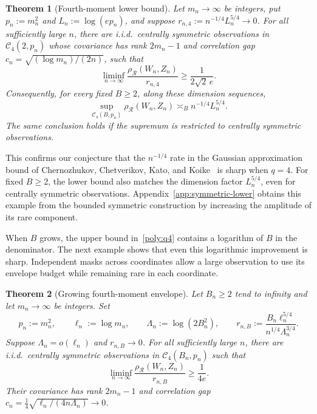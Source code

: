 \documentclass[11pt,letterpaper]{article}
\newtheorem{theorem}{Theorem}
\theoremstyle{remark}
\newcommand{\rh}{\rho_{\mathcal R}}
\begin{document}
\begin{theorem}[Fourth-moment lower bound]\label{opt:q4-lower}
Let \(m_n\to\infty\) be integers, put \(p_n:=m_n^2\) and
\(L_n:=\log(ep_n)\), and suppose
\(r_{n,4}:=n^{-1/4}L_n^{5/4}\to0\).
For all sufficiently large \(n\), there are i.i.d.\ centrally
symmetric observations in \(\mathcal C_4(2,p_n)\) whose covariance
has rank \(2m_n-1\) and correlation gap
\(c_n=\sqrt{(\log m_n)/(2n)}\), such that
\begin{equation}
 \liminf_{n\to\infty}
 \frac{\rh(W_n,Z_n)}{r_{n,4}}\ge\frac1{2\sqrt2\,e}.
 \label{opt:eq:q4-lower}
\end{equation}
Consequently, for every fixed \(B\ge2\), along these dimension sequences,
\begin{equation}
 \sup_{\mathcal C_4(B,p_n)}\rh(W_n,Z_n)
 \asymp_B n^{-1/4}L_n^{5/4}.
 \label{lower:q4-fixed}
\end{equation}
The same conclusion holds if the supremum is restricted to centrally
symmetric observations.
\end{theorem}

This confirms our conjecture that the \(n^{-1/4}\) rate in the Gaussian
approximation bound of Chernozhukov, Chetverikov, Kato, and
Koike~\cite[Theorem~2.5]{CCKK2022} is sharp when \(q=4\).
For fixed \(B\ge2\), the lower bound also matches the dimension factor
\(L_n^{5/4}\), even for centrally symmetric observations.
Appendix~\ref{app:symmetric-lower} obtains this example from the
bounded symmetric construction by increasing the amplitude of its rare
component.

When \(B\) grows, the upper bound in~\eqref{poly:q4} contains a
logarithm of \(B\) in the denominator. The next example shows that even
this logarithmic improvement is sharp. Independent masks across
coordinates allow a large observation to use its envelope budget while
remaining rare in each coordinate.

\begin{theorem}[Growing fourth-moment envelope]\label{opt:q4-growing}
Let \(B_n\ge2\) tend to infinity and let \(m_n\to\infty\) be integers.
Set
\[
 p_n:=m_n^2,\qquad \ell_n:=\log m_n,\qquad
 \Lambda_n:=\log(2B_n^2),\qquad
 r_{n,B}:=\frac{B_n\ell_n^{5/4}}{n^{1/4}\Lambda_n^{3/4}}.
\]
Suppose \(\Lambda_n=o(\ell_n)\) and \(r_{n,B}\to0\).
For all sufficiently large \(n\), there are i.i.d.\ centrally
symmetric observations in \(\mathcal C_4(B_n,p_n)\) such that
\begin{equation}
 \liminf_{n\to\infty}
 \frac{\rh(W_n,Z_n)}{r_{n,B}}\ge\frac1{4e}.
 \label{opt:eq:q4-growing}
\end{equation}
Their covariance has rank \(2m_n-1\) and correlation gap
\(c_n=\frac14\sqrt{\ell_n/(4n\Lambda_n)}\to0\).
\end{theorem}
\end{document}
